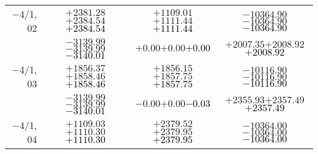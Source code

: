 \documentclass[compress]{beamer}
\begin{document}
\begin{frame}
{\begin{tabular}{r | c | c | c}
$-$4/1, 02 & $+2381.28$\hspace{0.1 cm}$+2384.54$\hspace{0.1 cm}\textcolor{black}{$+2384.54$} & $+1109.01$\hspace{0.1 cm}$+1111.44$\hspace{0.1 cm}\textcolor{black}{$+1111.44$} & $-10364.90$\hspace{0.1 cm}$-10364.90$\hspace{0.1 cm}\textcolor{black}{$-10364.90$} \\
           & $-3139.99$\hspace{0.1 cm}$-3139.99$\hspace{0.1 cm}\textcolor{black}{$-3140.01$} & $+0.00$\hspace{0.1 cm}$+0.00$\hspace{0.1 cm}\textcolor{black}{$+0.00$} & $+2007.35$\hspace{0.1 cm}$+2008.92$\hspace{0.1 cm}\textcolor{black}{$+2008.92$} \\
$-$4/1, 03 & $+1856.37$\hspace{0.1 cm}$+1858.46$\hspace{0.1 cm}\textcolor{black}{$+1858.46$} & $+1856.15$\hspace{0.1 cm}$+1857.75$\hspace{0.1 cm}\textcolor{black}{$+1857.75$} & $-10116.90$\hspace{0.1 cm}$-10116.90$\hspace{0.1 cm}\textcolor{black}{$-10116.90$} \\
           & $-3139.99$\hspace{0.1 cm}$-3139.99$\hspace{0.1 cm}\textcolor{black}{$-3140.01$} & $-0.00$\hspace{0.1 cm}$+0.00$\hspace{0.1 cm}\textcolor{black}{$-0.03$} & $+2355.93$\hspace{0.1 cm}$+2357.49$\hspace{0.1 cm}\textcolor{black}{$+2357.49$} \\
$-$4/1, 04 & $+1109.03$\hspace{0.1 cm}$+1110.30$\hspace{0.1 cm}\textcolor{black}{$+1110.30$} & $+2379.52$\hspace{0.1 cm}$+2379.95$\hspace{0.1 cm}\textcolor{black}{$+2379.95$} & $-10364.00$\hspace{0.1 cm}$-10364.00$\hspace{0.1 cm}\textcolor{black}{$-10364.00$} \\

\end{tabular}}
\end{frame}
\end{document}
